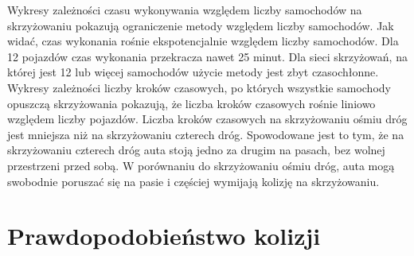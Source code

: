Wykresy zależności czasu wykonywania względem liczby samochodów na skrzyżowaniu pokazują ograniczenie metody względem liczby samochodów. Jak widać, czas wykonania rośnie ekspotencjalnie względem liczby samochodów. Dla 12 pojazdów czas wykonania przekracza nawet 25 minut. Dla sieci skrzyżowań, na której jest 12 lub więcej samochodów użycie metody jest zbyt czasochłonne.
\newline
\indent
Wykresy zależności liczby kroków czasowych, po których wszystkie samochody opuszczą skrzyżowania pokazują, że liczba kroków czasowych rośnie liniowo względem liczby pojazdów. 
\newline
\indent
Liczba kroków czasowych na skrzyżowaniu ośmiu dróg jest mniejsza niż na skrzyżowaniu czterech dróg. Spowodowane jest to tym, że na skrzyżowaniu czterech dróg auta stoją jedno za drugim na pasach, bez wolnej przestrzeni przed sobą. W porównaniu do skrzyżowaniu ośmiu dróg, auta mogą swobodnie poruszać się na pasie i częściej wymijają kolizję na skrzyżowaniu.

\section{Prawdopodobieństwo kolizji}

